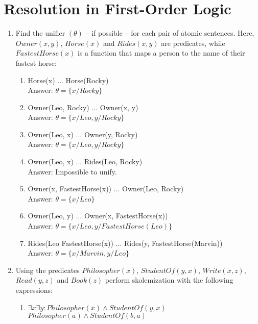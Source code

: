 \documentclass[paper=a4, fontsize=11pt]{scrartcl} %
\numberwithin{equation}{section} %
\numberwithin{figure}{section} %
\numberwithin{table}{section} %
\begin{document}
\section{Resolution in First-Order Logic}
\begin{enumerate}
	\item
	Find the unifier $(\theta)$ – if possible – for each pair of atomic sentences. Here, $Owner(x, y)$, $Horse(x)$ and $Rides(x,y)$ are predicates, while $FastestHorse(x)$ is a function that maps a person to the name of their fastest horse:

	\begin{enumerate}
		\item %
		Horse(x) ... Horse(Rocky)\\
		Answer: $\theta = \{x/Rocky\}$\\
		
		\item %
		Owner(Leo, Rocky) ... Owner(x, y)\\
		Answer: $\theta = \{ x/Leo, y/Rocky\}$\\

		\item %
		Owner(Leo, x) ... Owner(y, Rocky)\\
		Answer: $\theta = \{ x/Leo, y/Rocky\}$\\

		\item %
		Owner(Leo, x) ... Rides(Leo, Rocky)\\
		Answer: Impossible to unify.\\
		
		\item %
		Owner(x, FastestHorse(x)) ... Owner(Leo, Rocky)\\
		Answer: $\theta = \{x/Leo\}$\\

		\item %
		Owner(Leo, y) ... Owner(x, FastestHorse(x))\\
		Answer: $\theta = \{x/Leo, y/FastestHorse(Leo)\}$\\

		\item %
		Rides(Leo FastestHorse(x)) ... Rides(y, FastestHorse(Marvin))\\
		Answer: $\theta = \{x/Marvin, y/Leo\}$

	\end{enumerate}
	\item
	Using the predicates $Philosopher(x)$, $StudentOf(y,x)$, $Write(x,z)$, $Read(y,z)$ and $Book(z)$ perform
	skolemization with the following expressions:
	\begin{enumerate}
		\item
		$\exists x \exists y: Philosopher (x) \wedge StudentOf(y,x)$\\
		$Philosopher(a) \wedge StudentOf(b,a)$\\
		

\end{enumerate}
\end{enumerate}
\end{document}
